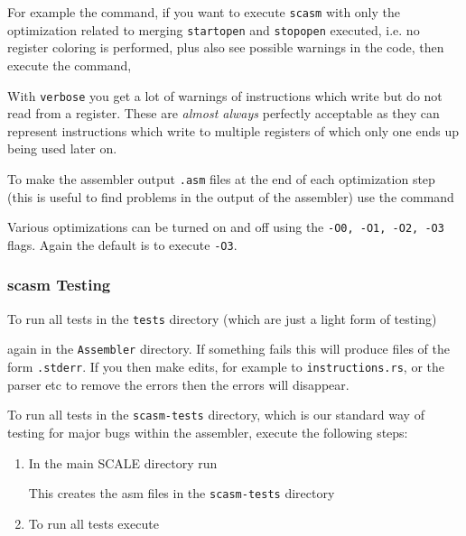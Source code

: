 
\noindent
For example the command, if you want to execute \verb+scasm+ with 
only the optimization related to merging \verb+startopen+ and 
\verb+stopopen+ executed, i.e. no register coloring is performed,
plus also see possible warnings in the code, then execute the command, 


\noindent With \verb+verbose+ you get a lot of warnings of instructions
which write but do not read from a register. These are {\em almost
always} perfectly acceptable as they can represent instructions
which write to multiple registers of which only one ends up
being used later on.

To make the assembler output \verb+.asm+ files at the end
of each optimization step (this is useful to find problems in the
output of the assembler) use the command


\noindent
Various optimizations can be turned on and off using the 
\verb+-O0, -O1, -O2, -O3+ flags. Again the default is to execute
\verb+-O3+.


\subsubsection{scasm Testing}
To run all tests in the \verb+tests+ directory (which are just a light form of testing)


\noindent again in the \verb+Assembler+ directory.
If something fails this will produce files of the form \verb+.stderr+.
If you then make edits, for example to \verb+instructions.rs+, or the parser etc to remove the
errors then the errors will disappear.

\vspace{5mm}

\noindent To run all tests in the \verb+scasm-tests+ directory, which is our standard way of testing
for major bugs within the assembler, execute the following steps:
\begin{enumerate}
\item In the main SCALE directory run

This creates the asm files in the \verb+scasm-tests+ directory
\item To run all tests execute

\end{enumerate}

